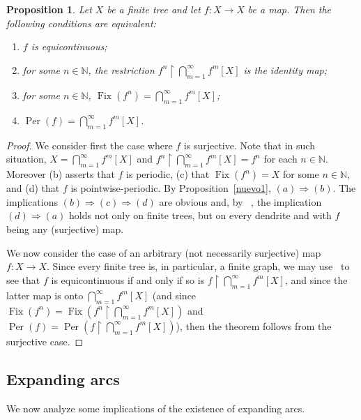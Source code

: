 \documentclass[12pt]{amsart}
\newtheorem{proposition}[theorem]{Proposition}
\theoremstyle{definition}
\numberwithin{equation}{section}
\DeclareMathOperator{\fix}{Fix}
\DeclareMathOperator{\per}{Per}
\begin{document}
\begin{proposition}\label{cor:firstfour}
Let $X$ be a finite tree and let $f \colon X\longrightarrow X$ be a map. Then the following conditions are equivalent:
\begin{enumerate}
\item[\emph{(a)}] $f$ is equicontinuous;
\item[\emph{(b)}] for some $n\in\mathbb N$, the restriction $f^n\upharpoonright\bigcap_{m=1}^\infty f^m[X]$ is 
        the identity map;
\item[\emph{(c)}] for some $n\in\mathbb N$, $\fix(f^n)=\bigcap_{m=1}^\infty f^m[X]$;
\item[\emph{(d)}] $\per(f)=\bigcap_{m=1}^\infty f^m[X]$.
\end{enumerate}
\end{proposition}
\begin{proof}
We consider first the case where $f$ is surjective. Note that in such situation, $X=\bigcap_{m=1}^\infty f^m[X]$
and $f^n\upharpoonright\bigcap_{m=1}^\infty f^m[X] = f^n$ for each $n\in\mathbb N$. Moreover (b) asserts
that $f$ is periodic, (c) that $\fix(f^n)= X$ for some $n\in\mathbb N$, and (d) that $f$ is pointwise-periodic.
By Proposition~\ref{nuevo1}, $(a) \Rightarrow (b)$.  The implications $(b) \Rightarrow (c) \Rightarrow (d)$ are
obvious and, by ~\cite[Theorem~4.14]{camargo-rincon-uzcategui}, the implication $(d) \Rightarrow (a)$
holds not only on finite trees, but on every dendrite and with $f$ being any (surjective) map.

We now consider the case of an arbitrary (not necessarily surjective) map 
$f \colon X\longrightarrow X.$ Since every finite tree is, in particular, a finite graph, we may 
use~\cite[Theorem 5.2]{mai} to see that $f$ is equicontinuous if and only if so is 
$f\upharpoonright\bigcap_{m=1}^\infty f^m[X]$, and since the latter map is onto 
$\bigcap_{m=1}^\infty f^m[X]$ (and since $\fix(f^n)=\fix(f^n\upharpoonright\bigcap_{m=1}^\infty f^m[X])$ and 
$\per(f)=\per(f\upharpoonright\bigcap_{m=1}^\infty f^m[X])$), then the theorem follows from the surjective case.
\end{proof}

\subsection{Expanding arcs}

We now analyze some implications of the existence of expanding arcs.
\end{document}
